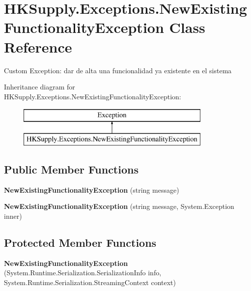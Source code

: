 \hypertarget{class_h_k_supply_1_1_exceptions_1_1_new_existing_functionality_exception}{}\section{H\+K\+Supply.\+Exceptions.\+New\+Existing\+Functionality\+Exception Class Reference}
\label{class_h_k_supply_1_1_exceptions_1_1_new_existing_functionality_exception}


Custom Exception\+: dar de alta una funcionalidad ya existente en el sistema  


Inheritance diagram for H\+K\+Supply.\+Exceptions.\+New\+Existing\+Functionality\+Exception\+:\begin{figure}[H]
\begin{center}
\leavevmode
\includegraphics[height=2.000000cm]{class_h_k_supply_1_1_exceptions_1_1_new_existing_functionality_exception}
\end{center}
\end{figure}
\subsection*{Public Member Functions}
\begin{DoxyCompactItemize}
\item 
\mbox{\label{class_h_k_supply_1_1_exceptions_1_1_new_existing_functionality_exception_a955fdbac911227d08700761322d1caf4}} 
{\bfseries New\+Existing\+Functionality\+Exception} (string message)
\item 
\mbox{\label{class_h_k_supply_1_1_exceptions_1_1_new_existing_functionality_exception_ad618069f35b77e231be47075550f3532}} 
{\bfseries New\+Existing\+Functionality\+Exception} (string message, System.\+Exception inner)
\end{DoxyCompactItemize}
\subsection*{Protected Member Functions}
\begin{DoxyCompactItemize}
\item 
\mbox{\label{class_h_k_supply_1_1_exceptions_1_1_new_existing_functionality_exception_aab365582c771361d35fdf7bda9cd0c11}} 
{\bfseries New\+Existing\+Functionality\+Exception} (System.\+Runtime.\+Serialization.\+Serialization\+Info info, System.\+Runtime.\+Serialization.\+Streaming\+Context context)
\end{DoxyCompactItemize}


